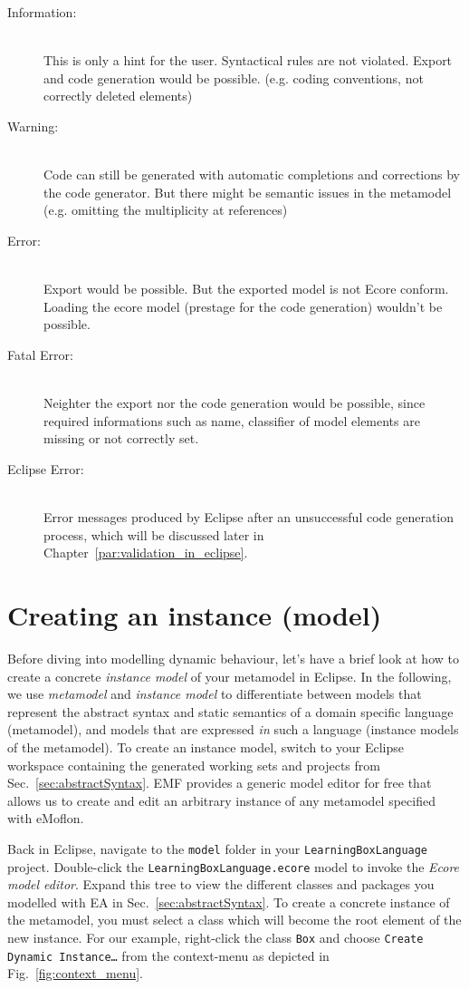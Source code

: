 \begin{description}
  \item[Information:]~\\ This is only a hint for the user. Syntactical rules are not violated. Export and code generation would be possible. (e.g. coding conventions, not correctly deleted elements)
  \item[Warning:]~\\ Code can still be generated with automatic completions and corrections by the code generator. But there might be semantic issues in the metamodel (e.g. omitting the multiplicity at references)
  \item[Error:]~\\ Export would be possible. But the exported model is not Ecore conform. Loading the ecore model (prestage for the code generation) wouldn't be possible.
  \item[Fatal Error:]~\\ Neighter the export nor the code generation would be possible, since required informations such as name, classifier of model elements are missing or not correctly set.
  \item[Eclipse Error:]~\\ Error messages produced by Eclipse after an unsuccessful code generation process, which will be discussed later in Chapter~\ref{par:validation_in_eclipse}.

\end{description}

\section{Creating an instance (model)}
\label{sect:instance}

Before diving into modelling dynamic behaviour, let's have a brief look at how
to create a concrete \emph{instance model} of your metamodel in Eclipse.
In the following, we use \emph{metamodel} and \emph{instance model} to
differentiate between models that represent the abstract syntax and
static semantics of a domain specific language (metamodel), and models that are
expressed \emph{in} such a language (instance models of the metamodel).
 To create an instance model, switch to your Eclipse workspace containing
the generated working sets and projects from Sec.~\ref{sec:abstractSyntax}.
EMF provides a generic model editor for free that allows us to create and edit
an arbitrary instance of any metamodel specified with eMoflon. 

Back in Eclipse, navigate to the \texttt{model} folder in your
\texttt{LearningBoxLanguage} project.  Double-click the
\texttt{LearningBoxLanguage.ecore} model to invoke  the \emph{Ecore model editor}. 
Expand this tree to view the different classes and packages you modelled with EA
in Sec.~\ref{sec:abstractSyntax}.
To create a concrete instance of the metamodel, you must select a class which
will become the root element of the new instance.
For our example, right-click the class \texttt{Box} and choose \texttt{Create
Dynamic Instance\ldots} from the context-menu as depicted in
Fig.~\ref{fig:context_menu}. 

